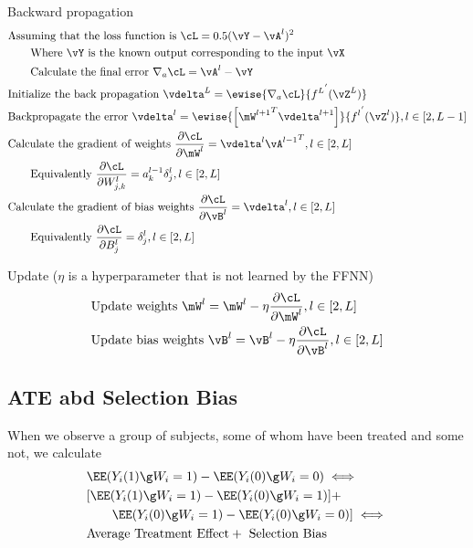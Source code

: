 Backward propagation
\begin {equation} \begin {split}
& \text {Assuming that the loss function is } \cL = 0.5 (\vY - \vA^l)^2 \\
& \qquad \text {Where $\vY$ is the known output corresponding to the input $\vX$} \\
& \qquad \text {Calculate the final error } \nabla_a \cL =  \vA^l - \vY \\
& \text {Initialize  the back propagation } \vdelta^L =  \ewise {\nabla_a \cL} {{f^L}^{'} (\vZ^L)} \\
& \text {Backpropagate the error } \vdelta^l =  \ewise {\left[ {\mW^{l+1}}^T \vdelta^{l+1} \right]} {{f^{l}}^{'} (\vZ^l)}, l \in [2, L-1] \\
& \text {Calculate the gradient of weights } \frac {\partial \cL} {\partial \mW^l} = \vdelta^l {\vA^{l-1}}^T, l \in [2, L] \\
& \qquad \text {Equivalently } \frac {\partial \cL} {\partial W_{j,k}^l} = a_k^{l-1} \delta_j^l, l \in [2, L] \\
& \text {Calculate the gradient of bias weights } \frac {\partial \cL} {\partial \vB^l} = \vdelta^l, l \in [2, L] \\
& \qquad \text {Equivalently } \frac {\partial \cL} {\partial B_j^l} = \delta_j^l, l \in [2, L] \\
\end {split} \end {equation}

Update ($\eta$ is a hyperparameter that is not learned by the FFNN)
\begin {equation} \begin {split}
& \text {Update weights } \mW^l = \mW^l - \eta \frac {\partial \cL} {\partial \mW^l}, l \in [2, L] \\
& \text {Update bias weights } \vB^l = \vB^l - \eta \frac {\partial \cL} {\partial \vB^l}, l \in [2, L] \\
\end {split} \end {equation}

\subsection {ATE abd Selection Bias} 
When we observe a group of subjects, some of whom have been treated and some not, we calculate
\begin {equation} \begin {split}
& \EE(Y_i(1) \g  W_i = 1) - \EE(Y_i(0) \g  W_i = 0) \iff \\
& [ \EE(Y_i(1) \g  W_i = 1) -  \EE(Y_i(0) \g  W_i = 1) ] +  \\
& \qquad \EE(Y_i(0) \g  W_i = 1) -  \EE(Y_i(0) \g  W_i = 0) ] \iff  \\
& \text {Average Treatment Effect} + \text { Selection Bias} \\
\end {split} \end {equation}

